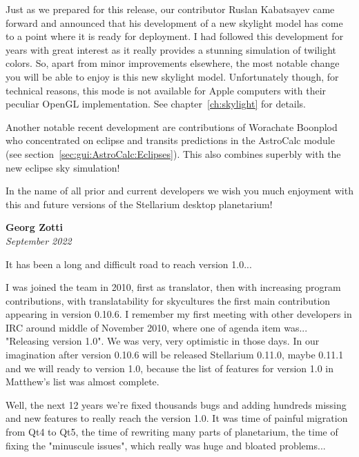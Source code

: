Just as we prepared for this release, our contributor Ruslan
Kabatsayev came forward and announced that his development of a new skylight
model has come to a point where it is ready for deployment. I had
followed this development for years with great interest as it really
provides a stunning simulation of twilight colors. So, apart from minor
improvements elsewhere, the most notable change you will be able to
enjoy is this new skylight model. Unfortunately though, for technical
reasons, this mode is not available for Apple computers with their
peculiar OpenGL implementation.  See chapter~\ref{ch:skylight} for
details.

Another notable recent development are contributions of Worachate
Boonplod who concentrated on eclipse and transits predictions in the AstroCalc
module (see section~\ref{sec:gui:AstroCalc:Eclipses}).  This also
combines superbly with the new eclipse sky simulation!

\vspace{2\baselineskip}



\noindent In the name of all prior and current developers we wish you much enjoyment with
this and future versions of the Stellarium desktop planetarium!


\vspace{2\baselineskip}

\begin{flushright}
\textbf{Georg Zotti} \\ \emph{September 2022}
\end{flushright}

\vspace{2\baselineskip}

It has been a long and difficult road to reach version 1.0...

I was joined the team in 2010, first as translator, then with increasing program contributions, with translatability for skycultures the first main contribution appearing in version 0.10.6. I remember my first meeting with other developers in IRC around middle of November 2010, where one of agenda item was... "Releasing version 1.0". We was very, very optimistic in those days. In our imagination after version 0.10.6 will be released Stellarium 0.11.0, maybe 0.11.1 and we will ready to version 1.0, because the list of features for version 1.0 in Matthew's list was almost complete. 

Well, the next 12 years we're fixed thousands bugs and adding hundreds missing and new features to really reach the version 1.0. It was time of painful migration from Qt4 to Qt5, the time of rewriting many parts of planetarium, the time of fixing the "minuscule issues", which really was huge and bloated problems...

